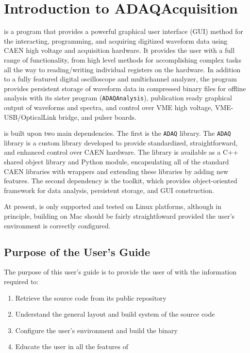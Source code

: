 \chapter{Introduction to ADAQAcquisition}
\label{chap:introdurction}

\ADAQ is a program that provides a powerful graphical user interface
(GUI) method for the interacting, programming, and acquiring digitized
waveform data using CAEN high voltage and acquisition hardware. It
provides the user with a full range of functionality, from high level
methods for accomplishing complex tasks all the way to reading/writing
individual registers on the hardware. In addition to a fully featured
digital oscilloscope and multichannel analyzer, the program provides
persistent storage of waveform data in compressed binary files for
offline analysis with its sister program (\texttt{ADAQAnalysis}),
publication ready graphical output of waveforms and spectra, and
control over VME high voltage, VME-USB/OpticalLink bridge, and pulser
boards.

\ADAQ is built upon two main dependencies. The first is the
\texttt{ADAQ} library. The \texttt{ADAQ} library is a custom library
developed to provide standardized, straightforward, and enhanced
control over CAEN hardware. The library is available as a C++ shared
object library and Python module, encapsulating all of the standard
CAEN libraries with wrappers and extending these libraries by adding
new features. The second dependency is the \ROOT toolkit, which
provides object-oriented framework for data analysis, persistent
storage, and GUI construction.

At present, \ADAQ is only supported and tested on Linux platforms,
although in principle, building on Mac should be fairly straightfoward
provided the user's environment is correctly configured.


\section{Purpose of the \ADAQ User's Guide}
\label{sec: overviewsoftware}

The purpose of this user's guide is to provide the user of \ADAQ with
the information required to:
\begin{enumerate}
\item{Retrieve the \ADAQ source code from its public \GIT repository}
\item{Understand the general layout and build system of the \ADAQ
  source code}
\item{Configure the user's environment and build the \ADAQ binary}
\item{Educate the user in all the features of \ADAQ}
\end{enumerate}

